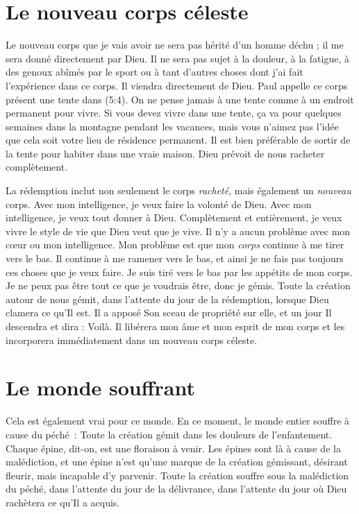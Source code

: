 \section*{Le nouveau corps céleste}

Le nouveau corps que je vais avoir ne sera pas hérité d'un homme déchu ;
 il me sera donné directement par Dieu.
 Il ne sera pas sujet à la douleur, à la fatigue, à des genoux abîmés
 par le sport ou à tant d'autres choses dont j'ai fait l'expérience
 dans ce corps. Il viendra directement de Dieu.
 Paul appelle ce corps présent une \og tente \fg{} dans (5:4).
 On ne pense jamais à une tente comme à un endroit permanent pour vivre.
 Si vous devez vivre dans une tente, ça va pour quelques semaines
 dans la montagne pendant les vacances, mais vous n'aimez pas l'idée
 que cela soit votre lieu de résidence permanent.
 Il est bien préférable de sortir de la tente pour habiter dans une vraie maison.
 Dieu prévoit de nous racheter complètement.

La rédemption inclut non seulement le corps \emph{racheté}, mais également
 un \emph{nouveau} corps. Avec mon intelligence, je veux faire la volonté de Dieu.
 Avec mon intelligence, je veux tout donner à Dieu.
 Complètement et entièrement, je veux vivre le style de vie que Dieu
 veut que je vive. Il n'y a aucun problème avec mon cœur ou mon intelligence.
 Mon problème est que mon \emph{corps} continue à me tirer vers le bas.
 Il continue à me ramener vers le bas, et ainsi je ne fais pas toujours
 ces choses que je veux faire. Je suis tiré vers le bas par les appétits
 de mon corps. Je ne peux pas être tout ce que je voudrais être,
 donc je gémis. Toute la création autour de nous gémit,
 dans l'attente du jour de la rédemption, lorsque Dieu clamera ce qu'Il est.
 Il a apposé Son sceau de propriété sur elle, et un jour Il descendra
 et dira : \og Voilà. \fg{}
 Il libérera mon âme et mon esprit de mon corps et les incorporera
 immédiatement dans un nouveau corps céleste.


\section*{Le monde souffrant}

Cela est également vrai pour ce monde.
 En ce moment, le monde entier souffre à cause du péché~:
 \og Toute la création gémit dans les douleurs de l'enfantement. \fg{}
 Chaque épine, dit-on, est une floraison à venir.
 Les épines sont là à cause de la malédiction, et une épine n'est qu'une 
 marque de la création gémissant, désirant fleurir, mais incapable
 d'y parvenir. Toute la création souffre sous la malédiction du péché,
 dans l'attente du jour de la délivrance, dans l'attente du jour
 où Dieu rachètera ce qu'Il a acquis.

